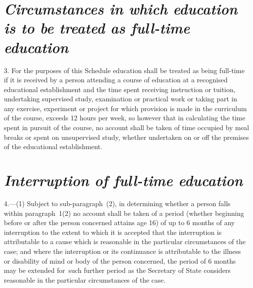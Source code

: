 \documentclass[a4paper,12pt]{article}
\begin{document}
\section*{\itshape Circumstances in which education is to be treated as full-time education}

3.  For the purposes of 
this Schedule  %
education shall be treated as being full-time if it is received by a person attending a course of education at a recognised educational establishment and the time spent receiving instruction or tuition, undertaking supervised study, examination or practical work or taking part in any exercise, experiment or project for which provision is made in the curriculum of the course, exceeds 12 hours per week, so however that in calculating the time spent in pursuit of the course, no account shall be taken of time occupied by meal breaks or spent on unsupervised study, whether undertaken on or off the premises of the educational establishment.


\section*{\itshape Interruption of full-time education}

4.—(1) Subject to sub-paragraph~(2), in determining whether a person falls within 
paragraph~1(2)  %
no account shall be taken of a period (whether beginning before or after the person concerned attains age 16) of up to 6 months of any interruption to the extent to which it is accepted that the interruption is attributable to a cause which is reasonable in the particular circumstances of the case; and where the interruption or its continuance is attributable to the illness or disability of mind or body of the person concerned, the period of 6 months may be extended for~such further period as 
the Secretary of State  %
considers reasonable in the particular circumstances of the case.

%
\end{document}
